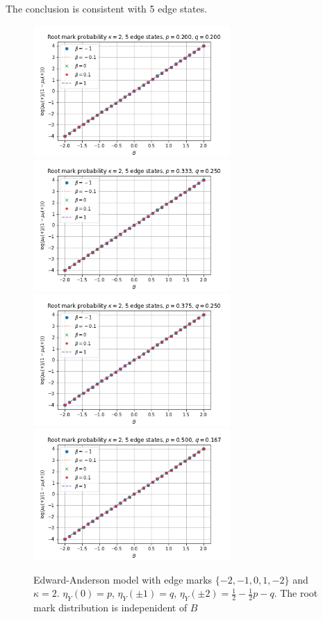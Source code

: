 \documentclass[12pt]{article}
\numberwithin{equation}{section}
\begin{document}
\newpage

The conclusion is consistent with 5 edge states.
\begin{figure}[h]
    \centering
    \includegraphics[width=7.5cm]{img/EA_x0_B_logi_kappa_2_5s_p=0.20_q=0.20.png}
    \includegraphics[width=7.5cm]{img/EA_x0_B_logi_kappa_2_5s_p=0.33_q=0.25.png}
    \includegraphics[width=7.5cm]{img/EA_x0_B_logi_kappa_2_5s_p=0.38_q=0.25.png}
    \includegraphics[width=7.5cm]{img/EA_x0_B_logi_kappa_2_5s_p=0.50_q=0.17.png}
    \caption{Edward-Anderson model with edge marks $\{-2, -1, 0, 1, -2\}$ and $\kappa=2$. $\eta_Y(0)=p$, $\eta_Y(\pm 1)=q$, $\eta_Y(\pm 2)=\frac12-\frac12p-q$. The root mark distribution is indepenident of $B$}
    \label{Fig.EA-RM-k2-5s}
\end{figure}
\end{document}
